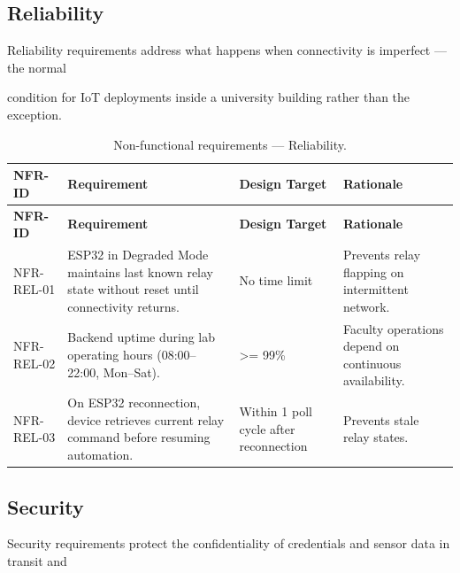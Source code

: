 \subsection{Reliability}
Reliability requirements address what happens when connectivity is imperfect --- the normal

condition for IoT deployments inside a university building rather than the exception.

\begin{longtable}{|L{2.5cm}|L{5.0cm}|L{3.2cm}|L{4.0cm}|}
	\caption{Non-functional requirements --- Reliability.} \label{tab:3-17}                                                                                                                                              \\
	\hline
	\textbf{NFR-ID} & \textbf{Requirement}                                                                              & \textbf{Design Target}                 & \textbf{Rationale}                                    \\
	\hline
	\endfirsthead
	\hline
	\textbf{NFR-ID} & \textbf{Requirement}                                                                              & \textbf{Design Target}                 & \textbf{Rationale}                                    \\
	\hline
	\endhead
	\hline
	\endfoot
	\hline
	\endlastfoot
	NFR-REL-01      & ESP32 in Degraded Mode maintains last known relay state without reset until connectivity returns. & No time limit                          & Prevents relay flapping on intermittent network.      \\
	\hline
	NFR-REL-02      & Backend uptime during lab operating hours (08:00--22:00, Mon--Sat).                               & >= 99\%                                & Faculty operations depend on continuous availability. \\
	\hline
	NFR-REL-03      & On ESP32 reconnection, device retrieves current relay command before resuming automation.         & Within 1 poll cycle after reconnection & Prevents stale relay states.                          \\
	\hline
\end{longtable}


\subsection{Security}
Security requirements protect the confidentiality of credentials and sensor data in transit and

